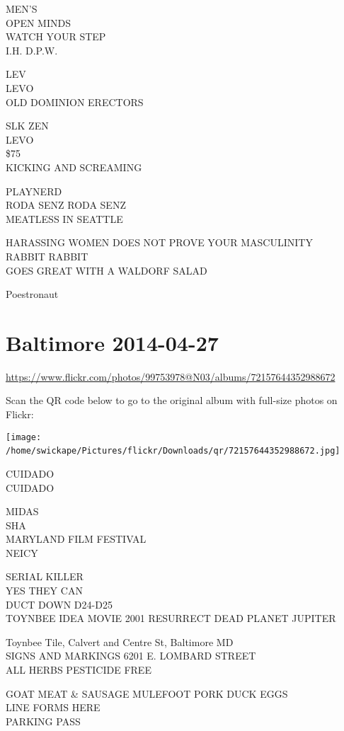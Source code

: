 \documentclass[10pt,letterpaper]{article}
\begin{document}
MEN'S\\
OPEN MINDS\\
WATCH YOUR STEP\\
I.H. D.P.W.

LEV\\
LEVO\\
OLD DOMINION ERECTORS

SLK ZEN\\
LEVO\\
\$75\\
KICKING AND SCREAMING

PLAYNERD\\
RODA SENZ RODA SENZ\\
MEATLESS IN SEATTLE

HARASSING WOMEN DOES NOT PROVE YOUR MASCULINITY\\
RABBIT RABBIT\\
GOES GREAT WITH A WALDORF SALAD

Poestronaut
\

\section*{Baltimore 2014-04-27}

\url{https://www.flickr.com/photos/99753978@N03/albums/72157644352988672}

Scan the QR code below to go to the original album with full-size photos on Flickr:

\texttt{[image: /home/swickape/Pictures/flickr/Downloads/qr/72157644352988672.jpg]}
\

CUIDADO\\
CUIDADO

MIDAS\\
SHA\\
MARYLAND FILM FESTIVAL\\
NEICY

SERIAL KILLER\\
YES THEY CAN\\
DUCT DOWN D24{-}D25\\
TOYNBEE IDEA MOVIE 2001 RESURRECT DEAD PLANET JUPITER

Toynbee Tile, Calvert and Centre St, Baltimore MD\\
SIGNS AND MARKINGS 6201 E. LOMBARD STREET\\
ALL HERBS PESTICIDE FREE

GOAT MEAT \& SAUSAGE MULEFOOT PORK DUCK EGGS\\
LINE FORMS HERE\\
PARKING PASS
\end{document}
